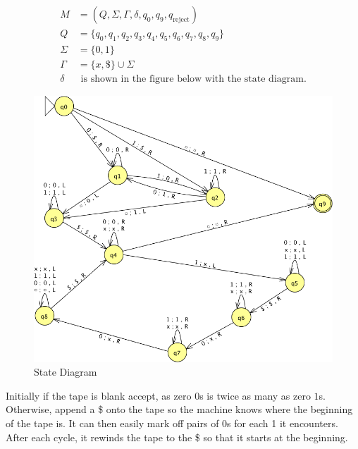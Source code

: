 \begin{problem}{2}
  \begin{solution}
    \begin{align*}
      M &= (Q, \Sigma, \Gamma, \delta, q_0, q_9,q_{\text{reject}}) \\
      Q &= \{ q_0,q_1,q_2,q_3,q_4,q_5,q_6,q_7,q_8,q_9 \} \\
      \Sigma &= \{ 0, 1 \}\\
      \Gamma &= \{ x, \$ \} \cup \Sigma \\
      \delta &\text{ is shown in the figure below with the state diagram.}
    \end{align*}
    \begin{figure}[H]
      \centering
      \caption{State Diagram}
      \includegraphics[scale=.6]{problem_2.png}
    \end{figure}
    Initially if the tape is blank accept, as zero $0$s is twice as many as zero $1$s. Otherwise, append a \$ onto the
    tape so the machine knows where the beginning of the tape is. It can then easily mark off pairs of 0s for each 1 it
    encounters. After each cycle, it rewinds the tape to the \$ so that it starts at the beginning.
  \end{solution}
\end{problem}

\begin{problem}{3}
  \begin{solution}

  \end{solution}
\end{problem}

